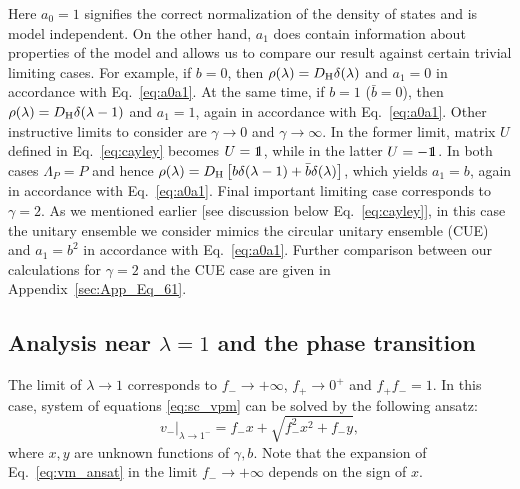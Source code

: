 \documentclass[%
 reprint,
 superscriptaddress,
 amsmath,amssymb,
prx,
]{revtex4-2}\href{\href{}{}}{}
\begin{document}
Here $a_0=1$ signifies the correct normalization of the density of states and is model independent.
On the other hand, $a_1$ does contain information about properties of the model and allows us to compare our result against certain trivial limiting cases.
For example, if $b=0$, then $\rho(\lambda) = D_{\rm H}\delta(\lambda)$ and $a_1=0$ in accordance with Eq.~\eqref{eq:a0a1}.
At the same time, if $b=1$ ($\bar b=0$), then $\rho(\lambda) = D_{\rm H}\delta(\lambda-1)$ and $a_1=1$, again in accordance with Eq.~\eqref{eq:a0a1}.
Other instructive limits to consider are $\gamma\to 0 $ and $\gamma\to\infty$.
In the former limit, matrix $U$ defined in Eq.~\eqref{eq:cayley} becomes $U=\openone$, while in the latter $U=-\openone$.
In both cases $\Lambda_P = P$ and hence $\rho(\lambda) = D_{\rm H}\left[ b \delta(\lambda-1) +\bar b \delta(\lambda)\right]$, which yields $a_1=b$, again in accordance with Eq.~\eqref{eq:a0a1}.
Final important limiting case corresponds to $\gamma=2$.
As we mentioned earlier [see discussion below Eq.~\eqref{eq:cayley}], in this case the unitary ensemble we consider mimics the circular unitary ensemble (CUE) and $a_1=b^2$ in accordance with Eq.~\eqref{eq:a0a1}.
Further comparison between our calculations for $\gamma=2$ and the CUE case are given in Appendix~\ref{sec:App_Eq_61}.



\subsection{Analysis near $\lambda=1$ and the phase transition}

The limit of $\lambda\to1$ corresponds to $f_-\to+\infty$, $f_+\to 0^+$ and $f_+f_-=1$.
In this case, system of equations \eqref{eq:sc_vpm} can be solved by the following ansatz:
\begin{equation}
	v_-|_{\lambda\to1^-}=f_-x+\sqrt{f_-^2x^2+f_-y},
	\label{eq:vm_ansat}
\end{equation}
where $x,y$ are unknown functions of $\gamma,b$.
Note that the expansion of Eq.~\eqref{eq:vm_ansat} in the limit $f_-\to+\infty$ depends on the sign of $x$.
\end{document}
